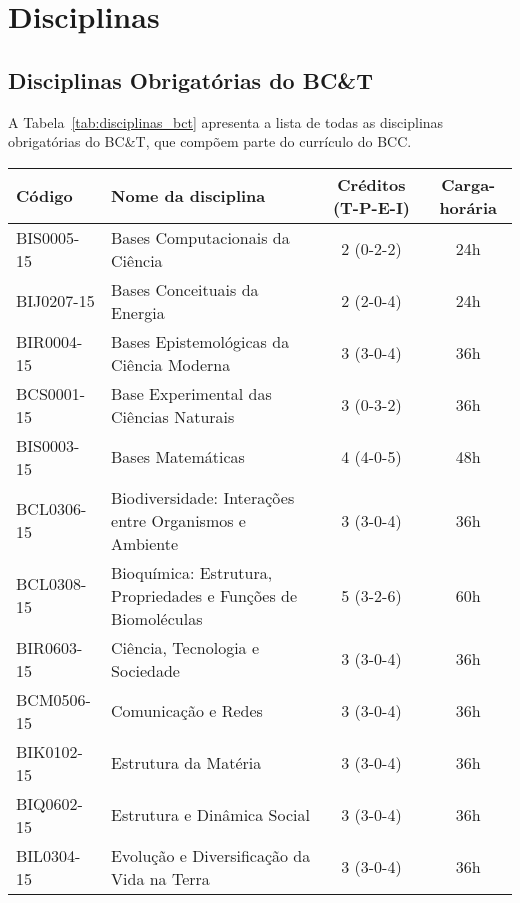 \section {Disciplinas}

\subsection{Disciplinas Obrigatórias do BC\&T}

A Tabela~\ref{tab:disciplinas_bct} apresenta a lista de todas as
disciplinas obrigatórias do BC\&T, que compõem parte do currículo do BCC.

\begin{table}[!h]
    \caption{Lista de disciplinas obrigatórias do BC\&T.}
    \label{tab:disciplinas_bct}

    \centering
    \begin{longtable}{|l|p{}|c|c|}
        \hline
        \textbf{Código} & \textbf{Nome da disciplina} & \textbf{Créditos (T-P-E-I)} & \textbf{Carga-horária}\\
        \hline\hline
        BIS0005-15 & Bases Computacionais da Ciência & 2 (0-2-2) & 24h\\
        \hline
        BIJ0207-15 & Bases Conceituais da Energia & 2 (2-0-4) & 24h\\
        \hline
        BIR0004-15 & Bases Epistemológicas da Ciência Moderna & 3 (3-0-4) & 36h\\
        \hline
        BCS0001-15 & Base Experimental das Ciências Naturais & 3 (0-3-2) & 36h\\
        \hline
        BIS0003-15 & Bases Matemáticas & 4 (4-0-5) & 48h\\
        \hline
        BCL0306-15 & Biodiversidade: Interações entre Organismos e Ambiente & 3 (3-0-4) & 36h\\
        \hline
        BCL0308-15 & Bioquímica: Estrutura, Propriedades e Funções de Biomoléculas & 5 (3-2-6) & 60h\\
        \hline
        BIR0603-15 & Ciência, Tecnologia e Sociedade & 3 (3-0-4) & 36h\\
        \hline
        BCM0506-15 & Comunicação e Redes & 3 (3-0-4) & 36h\\
        \hline
        BIK0102-15 & Estrutura da Matéria & 3 (3-0-4) & 36h\\
        \hline
        BIQ0602-15 & Estrutura e Dinâmica Social & 3 (3-0-4) & 36h \\
        \hline
        BIL0304-15 & Evolução e Diversificação da Vida na Terra & 3 (3-0-4) & 36h\\

\end{longtable}
\end{table}
